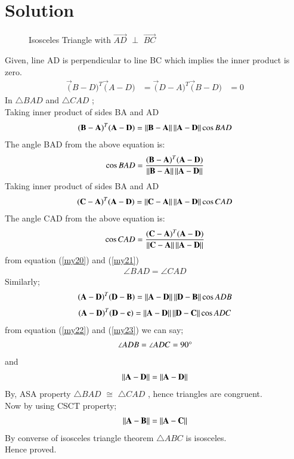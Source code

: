 \documentclass[journal,12pt,twocolumn]{IEEEtran}
\begin{document}
\section{Solution}
\renewcommand{\thefigure}{1}
\begin{figure}[!ht]
\centering
\resizebox{\columnwidth}{!}{}
\caption{Isosceles Triangle with $\vec{AD}$  $\perp$ $\vec{BC}$}
\label{fig:tri_right_angle}
\end{figure}
Given,
   line AD is perpendicular to line BC which implies the inner product is zero.  
\begin{align}
\vec(B-D)^T \vec(A-D) &= \vec(D-A)^T \vec(B-D)&= 0
\end{align}
In $\triangle{BAD}$ and $\triangle{CAD}$ ;\\
Taking inner product of sides BA and AD
\begin{align}
 (\mathbf{B}-\mathbf{A})^T(\mathbf{A}-\mathbf{D}) =
    \left\lVert\mathbf{B}-\mathbf{A}\right\rVert\left\lVert\mathbf{A}-\mathbf{D}\right\rVert\cos{BAD}
\end{align}
The angle BAD from the  above equation is:
\begin{align}\label{my20}
     \cos{BAD} = \frac{(\mathbf{B}-\mathbf{A})^T(\mathbf{A}-\mathbf{D})}{\left\lVert\mathbf{B}-\mathbf{A}\right\rVert\left\lVert\mathbf{A}-\mathbf{D}\right\rVert} 
     \end{align}
Taking inner product of sides BA and AD
\begin{align}
 (\mathbf{C}-\mathbf{A})^T(\mathbf{A}-\mathbf{D}) =
    \left\lVert\mathbf{C}-\mathbf{A}\right\rVert\left\lVert\mathbf{A}-\mathbf{D}\right\rVert\cos{CAD}
    \end{align}
    The angle CAD from the  above equation is:
\begin{align}\label{my21}
     \cos{CAD} = \frac{(\mathbf{C}-\mathbf{A})^T(\mathbf{A}-\mathbf{D})}{\left\lVert\mathbf{C}-\mathbf{A}\right\rVert\left\lVert\mathbf{A}-\mathbf{D}\right\rVert} 
     \end{align}
from equation (\ref{my20}) and (\ref{my21})\\
\begin{align}
\angle {BAD}=\angle {CAD}
\end{align}
%
Similarly;
\begin{align}\label{my22}
 (\mathbf{A}-\mathbf{D})^T(\mathbf{D}-\mathbf{B}) =
    \left\lVert\mathbf{A}-\mathbf{D}\right\rVert\left\lVert\mathbf{D}-\mathbf{B}\right\rVert\cos{ADB}
    \end{align}
%
\begin{align}\label{my23}
    (\mathbf{A}-\mathbf{D})^T(\mathbf{D}-\mathbf{c}) =
    \left\lVert\mathbf{A}-\mathbf{D}\right\rVert\left\lVert\mathbf{D}-\mathbf{C}\right\rVert\cos{ADC}
    \end{align}
%
from equation (\ref{my22}) and (\ref{my23}) we can say;
\begin{align}
    \angle {ADB}=\angle {ADC}=90\degree
    \end{align}
    and
\begin{align}
\left\lVert\mathbf{A-D}\right\rVert = \left\lVert\mathbf{A-D}\right\rVert
\end{align}
By, ASA property $\triangle{BAD}$ $\cong$ $\triangle{CAD}$ ,
hence triangles are congruent. \\ 
Now by using CSCT property;\\
%
\begin{align}
\left\lVert\mathbf{A-B}\right\rVert = \left\lVert\mathbf{A-C}\right\rVert 
\end{align}
%
By converse of isosceles triangle theorem $\triangle{ABC}$ is isosceles.\\
Hence proved.
\end{document}
